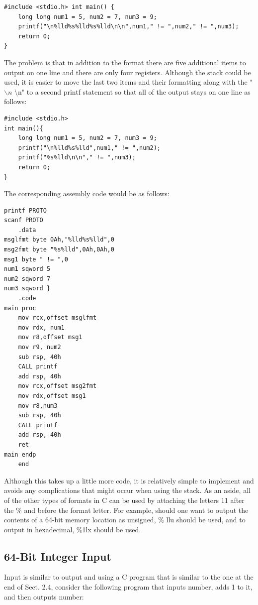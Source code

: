 \documentclass[10pt]{book}
\begin{document}
\begin{verbatim}
#include <stdio.h> int main() {
    long long num1 = 5, num2 = 7, num3 = 9;
    printf("\n%lld%s%lld%s%lld\n\n",num1," != ",num2," != ",num3);
    return 0;
}
\end{verbatim}

The problem is that in addition to the format there are five additional items to output on one line and there are only four registers. Although the stack could be used, it is easier to move the last two items and their formatting along with the " $\backslash n$ \textbackslash n" to a second printf statement so that all of the output stays on one line as follows:

\begin{verbatim}
#include <stdio.h>
int main(){
    long long num1 = 5, num2 = 7, num3 = 9;
    printf("\n%lld%s%lld",num1," != ",num2);
    printf("%s%lld\n\n"," != ",num3);
    return 0;
}
\end{verbatim}

The corresponding assembly code would be as follows:

\begin{verbatim}
printf PROTO
scanf PROTO
    .data
msglfmt byte 0Ah,"%lld%s%lld",0
msg2fmt byte "%s%lld",0Ah,0Ah,0
msg1 byte " != ",0
num1 sqword 5
num2 sqword 7
num3 sqword }
    .code
main proc
    mov rcx,offset msglfmt
    mov rdx, num1
    mov r8,offset msg1
    mov r9, num2
    sub rsp, 40h
    CALL printf
    add rsp, 40h
    mov rcx,offset msg2fmt
    mov rdx,offset msg1
    mov r8,num3
    sub rsp, 40h
    CALL printf
    add rsp, 40h
    ret
main endp
    end
\end{verbatim}

Although this takes up a little more code, it is relatively simple to implement and avoids any complications that might occur when using the stack. As an aside, all of the other types of formats in C can be used by attaching the letters 11 after the \% and before the format letter. For example, should one want to output the contents of a 64-bit memory location as unsigned, \% llu should be used, and to output in hexadecimal, \%1lx should be used.

\subsection{64-Bit Integer Input}
Input is similar to output and using a C program that is similar to the one at the end of Sect. 2.4, consider the following program that inputs number, adds 1 to it, and then outputs number:
\end{document}
